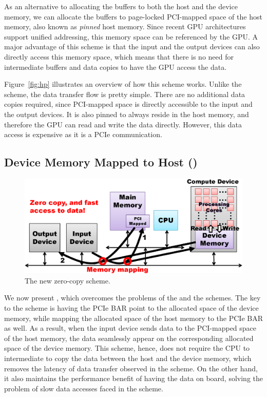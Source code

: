 As an alternative to allocating the buffers to both the host and the
device memory, we can allocate the buffers to page-locked PCI-mapped
space of the host memory, also known as \textit{pinned} host memory.
Since recent GPU architectures support unified addressing, this memory
space can be referenced by the GPU.
A major advantage of this scheme is that the input and the output
devices can also directly access this memory space, which means that
there is no need for intermediate buffers and data copies to have the
GPU access the data.

Figure~\ref{fig:hp} illustrates an overview of how this scheme works.
Unlike the {\hd} scheme, the data transfer flow is pretty simple.
There are no additional data copies required, since PCI-mapped space is
directly accessible to the input and the output devices.
It is also pinned to always reside in the host memory, and therefore the
GPU can read and write the data directly.
However, this data access is expensive as it is a PCIe communication.

\subsection{Device Memory Mapped to Host ({\dm})}
\label{sec:dm}

\begin{figure}[!t]
 \centering
 \includegraphics[width=\hsize]{eps/dm2.eps}
 \caption{The new zero-copy {\dm} scheme.}
 \label{fig:dm}
\end{figure}

We now present {\dm}, which overcomes the problems of the {\hd} and the
{\hp} schemes.
The key to the {\dm } scheme is having the PCIe BAR point to the
allocated space of the device memory, while mapping the allocated space
of the host memory to the PCIe BAR as well.
As a result, when the input device sends data to the PCI-mapped space of
the host memory, the data seamlessly appear on the corresponding
allocated space of the device memory.
This scheme, hence, does not require the CPU to intermediate to copy the
data between the host and the device memory, which removes the latency
of data transfer observed in the {\hd} scheme.
On the other hand, it also maintains the performance benefit of having
the data on board, solving the problem of slow data accesses faced in
the {\hp} scheme.

